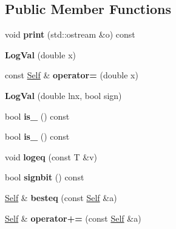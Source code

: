 \subsection*{Public Member Functions}
\begin{DoxyCompactItemize}
\item 
\mbox{\label{class_log_val_a1cf25fa35765ff7226f1b890d105fe00}} 
void {\bfseries print} (std\+::ostream \&o) const
\item 
\mbox{\label{class_log_val_a2458f02ebe7ce880119e53ab844281d5}} 
{\bfseries Log\+Val} (double x)
\item 
\mbox{\label{class_log_val_a9f482870805b1a452bbb0e3ddb07b6dc}} 
const \mbox{\hyperlink{class_log_val}{Self}} \& {\bfseries operator=} (double x)
\item 
\mbox{\label{class_log_val_a45b918ec28e8c91f4a518ce4facd38ae}} 
{\bfseries Log\+Val} (double lnx, bool sign)
\item 
\mbox{\label{class_log_val_a75a2a66720352cffa62a48d140baffa4}} 
bool {\bfseries is\+\_} () const
\item 
\mbox{\label{class_log_val_a82c8d7d945e882e827fed7f4ae65ca9e}} 
bool {\bfseries is\+\_} () const
\item 
\mbox{\label{class_log_val_a03c2b7c8332e468ff11052929355c616}} 
void {\bfseries logeq} (const T \&v)
\item 
\mbox{\label{class_log_val_aaef9ec7452ba12ecca3766488a0646a8}} 
bool {\bfseries signbit} () const
\item 
\mbox{\label{class_log_val_a0c016da33de751f731508d510035dc46}} 
\mbox{\hyperlink{class_log_val}{Self}} \& {\bfseries besteq} (const \mbox{\hyperlink{class_log_val}{Self}} \&a)
\item 
\mbox{\label{class_log_val_a8cbca1acb542587aabf0a0814d2bfd62}} 
\mbox{\hyperlink{class_log_val}{Self}} \& {\bfseries operator+=} (const \mbox{\hyperlink{class_log_val}{Self}} \&a)
\item 

\end{DoxyCompactItemize}
